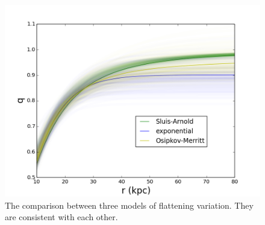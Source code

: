 \documentclass[12pt,preprint]{aastex}
\begin{document}
\begin{figure}[htbp]
\centering
\includegraphics[width=\textwidth]{q_variation}
\caption{The comparison between three models of flattening variation. They are consistent with each other.}
\label{f:fqv}
\end{figure}
\end{document}

